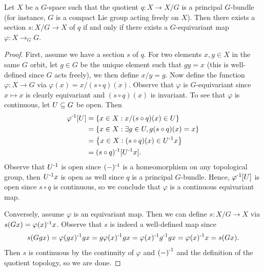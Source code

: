 \begin{lemma}
    Let $X$ be a $G$-space such that the quotient $q : X \to X/G$ is a principal $G$-bundle (for instance, $G$ is a compact Lie group acting freely on $X$).
    Then there exists a section $s : X/G \to X$ of $q$ if and only if there exists a $G$-equivariant map $\varphi : X \to_G G$.
    \begin{proof}
        First, assume we have a section $s$ of $q$.
        For two elements $x,y \in X$ in the same $G$ orbit, let $g \in G$ be the unique element such that $gy = x$ (this is well-defined since $G$ acts freely), we then define $x/y = g$.
        Now define the function $\varphi : X \to G$ via $\varphi(x) = x/(s \circ q)(x)$.
        Observe that $\varphi$ is $G$-equivariant since $x \mapsto x$ is clearly equivariant and $(s \circ q)(x)$ is invariant.
        To see that $\varphi$ is continuous, let $U \subseteq G$ be open.
        Then
        \begin{align*}
            \varphi^{\text{-}1}[U]
            &= \left\{ x \in X : x/(s \circ q)(x) \in U \right\} \\
            &= \left\{ x \in X : \exists g \in U, g (s \circ q)(x) = x \right\} \\
            &= \left\{ x \in X : (s \circ q)(x) \in U^{\text{-}1} x \right\} \\
            &= (s \circ q)^{\text{-}1}[U^{\text{-}1}x].
        \end{align*}
        Observe that $U^{\text{-}1}$ is open since $(-)^{\text{-}1}$ is a homeomorphism on any topological group, then $U^{\text{-}1}x$ is open as well since $q$ is a principal $G$-bundle.
        Hence, $\varphi^{\text{-}1}[U]$ is open since $s \circ q$ is continuous, so we conclude that $\varphi$ is a continuous equivariant map.
        
        Conversely, assume $\varphi$ is an equivariant map.
        Then we can define $s : X/G \to X$ via $s(Gx) = \varphi(x)^{\text{-}1} x$.
        Observe that $s$ is indeed a well-defined map since
        \[
            s(Ggx)
            = \varphi(gx)^{\text{-}1}gx
            = g\varphi(x)^{\text{-}1}gx
            = \varphi(x)^{\text{-}1}g^{\text{-}1}gx
            = \varphi(x)^{\text{-}1}x
            = s(Gx).
        \]
        Then $s$ is continuous by the continuity of $\varphi$ and $\left( - \right)^{\text{-}1}$ and the definition of the quotient topology, so we are done.
    \end{proof}
\end{lemma}

